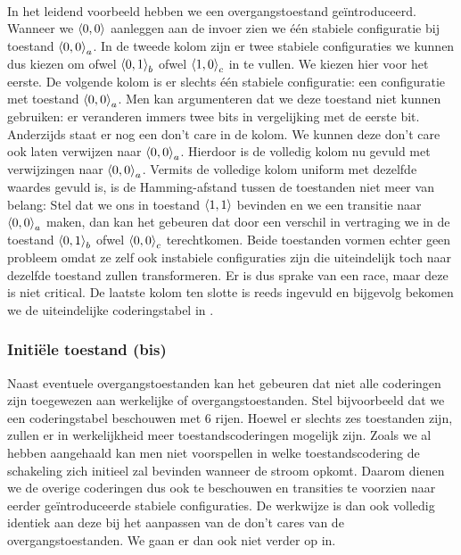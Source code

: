 \paragraph{}
In het leidend voorbeeld hebben we een overgangstoestand ge\"introduceerd. Wanneer we $\left\langle 0,0 \right\rangle$ aanleggen aan de invoer zien we \'e\'en stabiele configuratie bij toestand $\left\langle 0,0 \right\rangle_a$. In de tweede kolom zijn er twee stabiele configuraties we kunnen dus kiezen om ofwel $\left\langle 0,1 \right\rangle_b$ ofwel $\left\langle 1,0 \right\rangle_c$ in te vullen. We kiezen hier voor het eerste. De volgende kolom is er slechts \'e\'en stabiele configuratie: een configuratie met toestand $\left\langle 0,0 \right\rangle_a$. Men kan argumenteren dat we deze toestand niet kunnen gebruiken: er veranderen immers twee bits in vergelijking met de eerste bit. Anderzijds staat er nog een don't care in de kolom. We kunnen deze don't care ook laten verwijzen naar $\left\langle 0,0 \right\rangle_a$. Hierdoor is de volledig kolom nu gevuld met verwijzingen naar $\left\langle 0,0 \right\rangle_a$. Vermits de volledige kolom uniform met dezelfde waardes gevuld is, is de Hamming-afstand tussen de toestanden niet meer van belang: Stel dat we ons in toestand $\left\langle 1,1 \right\rangle$ bevinden en we een transitie naar $\left\langle 0,0 \right\rangle_a$ maken, dan kan het gebeuren dat door een verschil in vertraging we in de toestand $\left\langle 0,1 \right\rangle_b$ ofwel $\left\langle 0,0 \right\rangle_c$ terechtkomen. Beide toestanden vormen echter geen probleem omdat ze zelf ook instabiele configuraties zijn die uiteindelijk toch naar dezelfde toestand zullen transformeren. Er is dus sprake van een race, maar deze is niet critical. De laatste kolom ten slotte is reeds ingevuld en bijgevolg bekomen we de uiteindelijke coderingstabel in .
\subsubsection{Initi\"ele toestand (bis)}
Naast eventuele overgangstoestanden kan het gebeuren dat niet alle coderingen zijn toegewezen aan werkelijke of overgangstoestanden. Stel bijvoorbeeld dat we een coderingstabel beschouwen met $6$ rijen. Hoewel er slechts zes toestanden zijn, zullen er in werkelijkheid meer toestandscoderingen mogelijk zijn. Zoals we al hebben aangehaald kan men niet voorspellen in welke toestandscodering de schakeling zich initieel zal bevinden wanneer de stroom opkomt. Daarom dienen we de overige coderingen dus ook te beschouwen en transities te voorzien naar eerder ge\"introduceerde stabiele configuraties. De werkwijze is dan ook volledig identiek aan deze bij het aanpassen van de don't cares van de overgangstoestanden. We gaan er dan ook niet verder op in.
